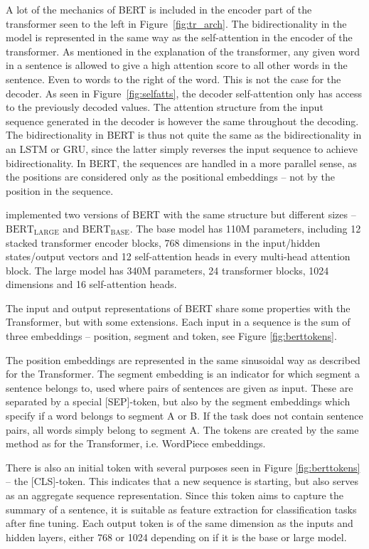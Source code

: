 A lot of the mechanics of BERT is included in the encoder part of the transformer seen to the left in Figure~\ref{fig:tr_arch}. The bidirectionality in the model is represented in the same way as the self-attention in the encoder of the transformer. As mentioned in the explanation of the transformer, any given word in a sentence is allowed to give a high attention score to all other words in the sentence. Even to words to the right of the word. This is not the case for the decoder. As seen in Figure~\ref{fig:selfatts}, the decoder self-attention only has access to the previously decoded values. The attention structure from the input sequence generated in the decoder is however the same throughout the decoding. The bidirectionality in BERT is thus not quite the same as the bidirectionality in an LSTM or GRU, since the latter simply reverses the input sequence to achieve bidirectionality. In BERT, the sequences are handled in a more parallel sense, as the positions are considered only as the positional embeddings -- not by the position in the sequence. 

\citeauthor{devlin2018bert} implemented two versions of BERT with the same structure but different sizes -- $\text{BERT}_{\text{LARGE}}$ and $\text{BERT}_{\text{BASE}}$. The base model has 110M parameters, including 12 stacked transformer encoder blocks, 768 dimensions in the input/hidden states/output vectors and 12 self-attention heads in every multi-head attention block. The large model has 340M parameters, 24 transformer blocks, 1024 dimensions and 16 self-attention heads. 

The input and output representations of BERT share some properties with the Transformer, but with some extensions. Each input in a sequence is the sum of three embeddings -- position, segment and token, see Figure \ref{fig:berttokens}. 

The position embeddings are represented in the same sinusoidal way as described for the Transformer. The segment embedding is an indicator for which segment a sentence belongs to, used where pairs of sentences are given as input. These are separated by a special \textsc{[SEP]}-token, but also by the segment embeddings which specify if a word belongs to segment \textsc{A} or \textsc{B}. If the task does not contain sentence pairs, all words simply belong to segment \textsc{A}. The tokens are created by the same method as for the Transformer, i.e. WordPiece embeddings. 

There is also an initial token with several purposes seen in Figure \ref{fig:berttokens} -- the \textsc{[CLS]}-token. This indicates that a new sequence is starting, but also serves as an aggregate sequence representation. Since this token aims to capture the summary of a sentence, it is suitable as feature extraction for classification tasks after fine tuning. Each output token is of the same dimension as the inputs and hidden layers, either 768 or 1024 depending on if it is the base or large model. 


